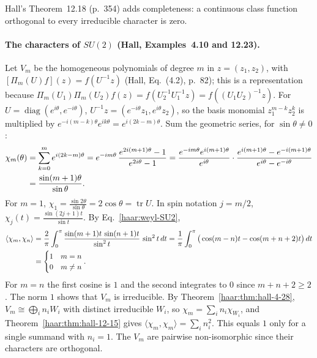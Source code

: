 Hall's Theorem~12.18 (p.~354) adds completeness: a continuous class function
orthogonal to every irreducible character is zero.

\paragraph{The characters of $SU(2)$ (Hall, Examples~4.10 and 12.23).} Let
$V_m$ be the homogeneous polynomials of degree $m$ in $z=(z_1,z_2)$, with
$[\Pi_m(U)f](z)=f(U^{-1}z)$ (Hall, Eq.~(4.2), p.~82); this is a
representation because $\Pi_m(U_1)\Pi_m(U_2)f(z)=f(U_2^{-1}U_1^{-1}z)
=f((U_1U_2)^{-1}z)$. For $U=\operatorname{diag}(e^{i\theta},e^{-i\theta})$,
$U^{-1}z=(e^{-i\theta}z_1,e^{i\theta}z_2)$, so the basis monomial
$z_1^{m-k}z_2^k$ is multiplied by $e^{-i(m-k)\theta}e^{ik\theta}
=e^{i(2k-m)\theta}$. Sum the geometric series, for $\sin\theta\ne0$:
\begin{align}
 \chi_m(\theta)&=\sum_{k=0}^me^{i(2k-m)\theta}
 =e^{-im\theta}\,\frac{e^{2i(m+1)\theta}-1}{e^{2i\theta}-1}
 =\frac{e^{-im\theta}e^{i(m+1)\theta}}{e^{i\theta}}\cdot
   \frac{e^{i(m+1)\theta}-e^{-i(m+1)\theta}}{e^{i\theta}-e^{-i\theta}}\notag\\
 &=\frac{\sin(m+1)\theta}{\sin\theta}.\label{haar:SU2-character}
\end{align}
For $m=1$, $\chi_1=\frac{\sin2\theta}{\sin\theta}=2\cos\theta
=\operatorname{tr}U$. In spin notation $j=m/2$, $\chi_j(t)=\frac{\sin(2j+1)t}{\sin t}$.
By Eq.~\eqref{haar:weyl-SU2},
\begin{align}
 \langle\chi_m,\chi_n\rangle
 &=\frac2\pi\int_0^\pi\frac{\sin(m+1)t\,\sin(n+1)t}{\sin^2t}\,\sin^2t\,dt
 =\frac1\pi\int_0^\pi\big(\cos(m-n)t-\cos(m+n+2)t\big)\,dt\notag\\
 &=\begin{cases}1&m=n\\0&m\ne n\end{cases}.\label{haar:SU2-character-orthonormal}
\end{align}
For $m=n$ the first cosine is $1$ and the second integrates to $0$ since
$m+n+2\ge2$. The norm $1$ shows that $V_m$ is irreducible. By
Theorem~\ref{haar:thm:hall-4-28}, $V_m\cong\bigoplus_in_iW_i$ with distinct
irreducible $W_i$, so $\chi_m=\sum_in_i\chi_{W_i}$, and
Theorem~\ref{haar:thm:hall-12-15} gives
$\langle\chi_m,\chi_m\rangle=\sum_in_i^2$. This equals $1$ only for a single
summand with $n_i=1$. The $V_m$ are pairwise non-isomorphic since their
characters are orthogonal.
